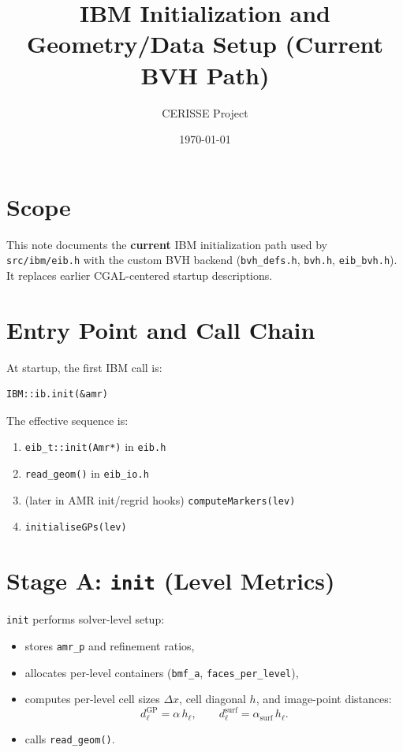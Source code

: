 \documentclass[11pt,a4paper]{article}
\title{\textbf{IBM Initialization and Geometry/Data Setup (Current BVH Path)}}
\author{CERISSE Project}
\date{\today}
\begin{document}
\maketitle

\section{Scope}

This note documents the \textbf{current} IBM initialization path used by
\texttt{src/ibm/eib.h} with the custom BVH backend
(\texttt{bvh\_defs.h}, \texttt{bvh.h}, \texttt{eib\_bvh.h}).
It replaces earlier CGAL-centered startup descriptions.

\section{Entry Point and Call Chain}

At startup, the first IBM call is:
\begin{verbatim}
IBM::ib.init(&amr)
\end{verbatim}

The effective sequence is:
\begin{enumerate}[nosep]
  \item \texttt{eib\_t::init(Amr*)} in \texttt{eib.h}
  \item \texttt{read\_geom()} in \texttt{eib\_io.h}
  \item (later in AMR init/regrid hooks) \texttt{computeMarkers(lev)}
  \item \texttt{initialiseGPs(lev)}
\end{enumerate}

\section{Stage A: \texttt{init} (Level Metrics)}

\texttt{init} performs solver-level setup:
\begin{itemize}[nosep]
  \item stores \texttt{amr\_p} and refinement ratios,
  \item allocates per-level containers (\texttt{bmf\_a}, \texttt{faces\_per\_level}),
  \item computes per-level cell sizes \(\Delta x\), cell diagonal \(h\), and image-point distances:
  \[
  d^{\mathrm{GP}}_\ell = \alpha\,h_\ell,
  \qquad
  d^{\mathrm{surf}}_\ell = \alpha_{\mathrm{surf}}\,h_\ell.
  \]
  \item calls \texttt{read\_geom()}.
\end{itemize}
\end{document}
